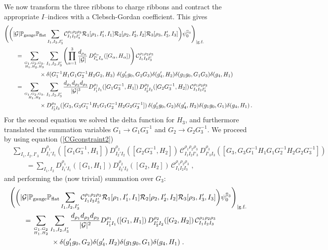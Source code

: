 \documentclass[nofootinbib,superscriptaddress,eqsecnum,tightenlines,11pt]{revtex4-1}
\def\nn{\nonumber}
\def\q{\qquad}
\def\mG{\mathcal{G}}
\begin{document}
We now transform the three ribbons to charge ribbons and contract the appropriate $I$--indices with a Clebsch-Gordan coefficient. This gives
\begin{align}
	&\Bigg( \bigg(   |\mG| \mathbb{P}_{\rm gauge} \mathbb{P}_{\rm flat} \sum_{I_1,I_2,I'_3}  {\cal C}^{\rho_1\rho_2\rho_3}_{I_1I_2I_3'}  {\cal R}_1[\rho_1,I_1',I_1]{\cal R}_2[\rho_2,I'_2,I_2]{\cal R}_3[\rho_3,I_3',I_3] \bigg) \psi^{{\mathbb S}_3}_0\Bigg)_{|\rm g.f.} \nn\\
	&\q =\sum_{G_1,G_2,G_3,\atop H_1,H_2,H_3}  \sum_{I_1,I_2,I'_3}
	\left( \prod_{\alpha=1}^3 \frac{d_{\rho_\alpha}}{|\mG|} \,D^{\rho_\alpha}_{I'_\alpha I_\alpha}([G_\alpha,H_\alpha]) \right) {\cal C}^{\rho_1\rho_2\rho_3}_{I_1I_2I_3'} \nn\\
	&\q \q \q \times \delta(    G_1^{-1} H_1 G_1 G_2^{-1} H_2 G_2  , H_3)\, \, \delta(g'_1 g_0,G_2 G_3) \delta(g'_4,H_2)\delta(g_1 g_0,G_1 G_3 ) \delta(  g_4,  H_1)  \nn\\
	& \q =
	\sum_{G_1,G_2,G_3,\atop H_1,H_2}  \sum_{I_1,I_2,I'_3} \frac{ d_{\rho_1} d_{\rho_2} d_{\rho_3}}{ |\mG|^3} 	
	D^{\rho_1}_{I'_1 I_1}([G_1 G_3^{-1},H_1])\, D^{\rho_2}_{I'_2 I_2}([G_2 G_3^{-1},H_2]) \, {\cal C}^{\rho_1\rho_2\rho_3}_{I_1I_2I_3'} \nn\\
	& \q \q \q \times D^{\rho_3}_{I'_3 I_3}([G_3 , G_3G_1^{-1} H_1 G_1 G_2^{-1} H_2 G_2G_3^{-1} ])
 	\, \delta(g'_1 g_0,G_2 ) \delta(g'_4,H_2)\delta(g_1 g_0,G_1  ) \delta(  g_4,  H_1)  \, .
\end{align}
For the second equation we solved the delta function for $H_3$, and furthermore translated the summation variables $G_1 \rightarrow G_1 G_3^{-1}$ and $G_2 \rightarrow G_2 G_3^{-1}$.  We proceed by using equation (\ref{CGconstraint2})
\begin{align}\label{CGconstraint2a}
&\sum_{I_1,I_2,I'_3} 
D^{\rho_1}_{I_1'I_1}([G_1G_3^{-1},H_1])   D^{\rho_2}_{I_2'I_2}([G_2G_3^{-1},H_2]) 
\,\mathcal{C}^{\rho_1 \rho_2\rho_3}_{I_1 I_2 I'_3}  \, 
D^{\rho_3}_{I'_3 I_3}([G_3 ,  G_3 G_1^{-1} H_1 G_1 G_2^{-1} H_2 G_2 G_3^{-1}])  \nn\\
&\q =
\sum_{I_1,I_2} 
D^{\rho_1}_{I_1'I_1}([G_1,H_1])   D^{\rho_2}_{I_2'I_2}([G_2,H_2]) 
\,\mathcal{C}^{\rho_1 \rho_2\rho_3}_{I_1 I_2 I_3}   \; ,
\end{align}
and performing the (now trivial) summation over $G_3$:
\begin{align}
&\Bigg( \bigg(   |\mG| \mathbb{P}_{\rm gauge} \mathbb{P}_{\rm flat} \sum_{I_1,I_2,I'_3}  {\cal C}^{\rho_1\rho_2\rho_3}_{I_1I_2I_3'}  {\cal R}_1[\rho_1,I_1',I_1]{\cal R}_2[\rho_2,I'_2,I_2]{\cal R}_3[\rho_3,I_3',I_3] \bigg) \psi^{{\mathbb S}_3}_0\Bigg)_{|\rm g.f.} \nn\\
& \q =
\sum_{G_1,G_2\atop H_1,H_2}  \sum_{I_1,I_2,I'_3} \frac{ d_{\rho_1} d_{\rho_2} d_{\rho_3}}{ |\mG|^2} 
D^{\rho_1}_{I'_1 I_1}([G_1,H_1])\, D^{\rho_2}_{I'_2 I_2}([G_2 ,H_2]) \, {\cal C}^{\rho_1\rho_2\rho_3}_{I_1I_2I_3} \nn\\
&\q\q\q \times   \delta(g'_1 g_0,G_2 ) \delta(g'_4,H_2)\delta(g_1 g_0,G_1  ) \delta(  g_4,  H_1) \; .\q\q
\end{align}
\end{document}
